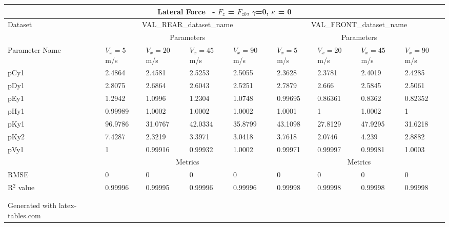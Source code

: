         \begin{tabular}{lllll|llll} \hline \multicolumn{9}{c}{Lateral Force~ - $F_z$ = $F_{z0}$, $\gamma$=0, $\kappa$ = 0}                                                                                                                                                                        \\ \hline Dataset                         & \multicolumn{4}{c|}{VAL\_REAR\_dataset\_name}                                                & \multicolumn{4}{c}{VAL\_FRONT\_dataset\_name}                                                     \\ \hline \multicolumn{1}{c}{}            & \multicolumn{4}{c|}{Parameters}                                                              & \multicolumn{4}{c}{Parameters}                                                                    \\ \hline Parameter Name                  & $V_x = 5$ m/s     & $V_x = 20$ m/s     & $V_x = 45$ m/s     & $V_x = 90$ m/s     & $V_x = 5$ m/s      & $V_x = 20$ m/s      & $V_x = 45$ m/s      & $V_x = 90$ m/s       \\ pCy1                            & 2.4864 & 2.4581 & 2.5253 & 2.5055 & 2.3628 & 2.3781 & 2.4019 & 2.4285  \\ pDy1                            & 2.8075 & 2.6864 & 2.6043 & 2.5251 & 2.7879 & 2.666 & 2.5845 & 2.5061  \\ pEy1                            & 1.2942 & 1.0996 & 1.2304 & 1.0748 & 0.99695 & 0.86361 & 0.8362 & 0.82352  \\ pHy1                            & 0.99989 & 1.0002 & 1.0002 & 1.0002 & 1.0001 & 1 & 1.0002 & 1  \\ pKy1                            & 96.9786 & 31.0767 & 42.0334 & 35.8799 & 43.1098 & 27.8129 & 47.9295 & 31.6218  \\ pKy2                            & 7.4287 & 2.3219 & 3.3971 & 3.0418 & 3.7618 & 2.0746 & 4.239 & 2.8882  \\ pVy1                            & 1 & 0.99916 & 0.99932 & 1.0002 & 0.99971 & 0.99997 & 0.99981 & 1.0003  \\ \hline \multicolumn{1}{c|}{}           & \multicolumn{4}{c|}{Metrics}                                                                 & \multicolumn{4}{c}{Metrics}                                                                       \\ \hline RMSE                            & 0 & 0 & 0 & 0 & 0 & 0 & 0 & 0  \\ R$^2$ value                       & 0.99996   & 0.99995   & 0.99996   & 0.99996   & 0.99998   & 0.99998   & 0.99998   & 0.99998    \\ \hline                                 &                      &                       &                       & \multicolumn{1}{l}{}  &                       &                        &                        &                         \\                                 &                      &                       &                       & \multicolumn{1}{l}{}  &                       &                        &                        &                         \\ Generated with latex-tables.com &                      &                       &                       & \multicolumn{1}{l}{}  &                       &                        &                        & \end{tabular} 
